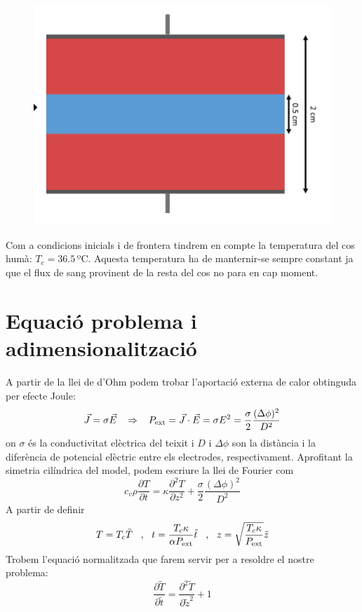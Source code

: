\documentclass{article}
\begin{document}
\begin{figure}[h]
    \centering
    \includegraphics[width = 0.4\linewidth]{images/esquema_temp.png}
\end{figure}

Com a condicions inicials i de frontera tindrem en compte la temperatura del cos humà: \(T_c = 36.5\,\text{ºC}\). Aquesta temperatura ha de manternir-se sempre constant ja que el flux de sang provinent de la resta del cos no para en cap moment.
\section{Equació problema i adimensionalització}
A partir de la llei de d'Ohm podem trobar l'aportació externa de calor obtinguda per efecte Joule:
\begin{equation*}
    \vec{J} = \sigma\vec{E} \hspace{0.3cm} \Rightarrow \hspace{0.3cm} P_{\text{ext}} = \vec{J}\cdot\vec{E} = \sigma E^2 = \frac{\sigma}{2} \frac{(\Delta \phi)^2}{D^2}
\end{equation*}
on $\sigma$ és la conductivitat elèctrica del teixit i $D$ i $\Delta \phi$ son la distància i la diferència de potencial elèctric entre els electrodes, respectivament. Aprofitant la simetria cilíndrica del model, podem escriure la llei de Fourier com
\begin{equation*}
    c_{v}\rho \frac{\partial T}{\partial t} = \kappa \frac{\partial ^2 T}{\partial z^2} + \frac{\sigma}{2} \frac{(\Delta \phi)^2}{D^2}
\end{equation*}
A partir de definir
\begin{equation*}
    T = T_c \tilde{T} \hspace{0.3cm} \text{,} \hspace{0.3cm} t = \frac{T_c \kappa}{\alpha P_{\text{ext}}}\tilde{t} \hspace{0.3cm} \text{,} \hspace{0.3cm} z = \sqrt{\frac{T_c \kappa}{P_{\text{ext}}}}\tilde{z}
\end{equation*}
Trobem l'equació normalitzada que farem servir per a resoldre el nostre problema:
\begin{equation}\label{EDP_norm}
    \frac{\partial \tilde{T}}{\partial \tilde{t}} = \frac{\partial ^2 \tilde{T}}{\partial \tilde{z}^2} + 1 
\end{equation}
\end{document}
